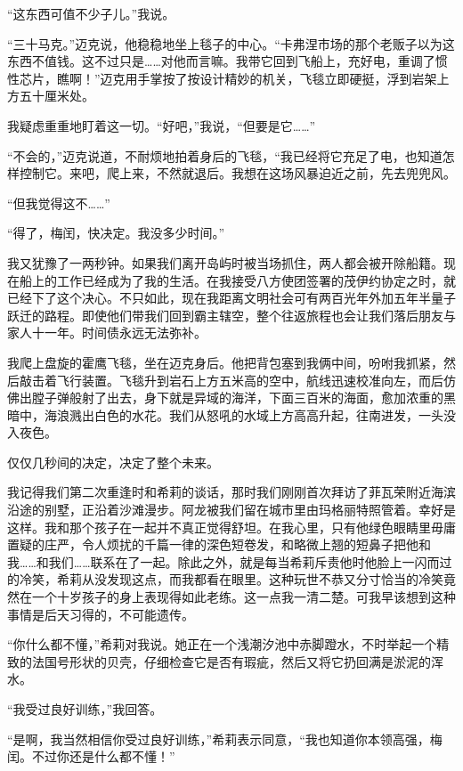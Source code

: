\documentclass[AutoFakeBold=true]{book}
\begin{document}
``这东西可值不少子儿。''我说。

``三十马克。''迈克说，他稳稳地坐上毯子的中心。``卡弗涅市场的那个老贩子以为这东西不值钱。这不过只是……对他而言嘛。我带它回到飞船上，充好电，重调了惯性芯片，瞧啊！''迈克用手掌按了按设计精妙的机关，飞毯立即硬挺，浮到岩架上方五十厘米处。

我疑虑重重地盯着这一切。``好吧，''我说，``但要是它……''

``不会的，''迈克说道，不耐烦地拍着身后的飞毯，``我已经将它充足了电，也知道怎样控制它。来吧，爬上来，不然就退后。我想在这场风暴迫近之前，先去兜兜风。

``但我觉得这不……''

``得了，梅闰，快决定。我没多少时间。''

我又犹豫了一两秒钟。如果我们离开岛屿时被当场抓住，两人都会被开除船籍。现在船上的工作已经成为了我的生活。在我接受八方使团签署的茂伊约协定之时，就已经下了这个决心。不只如此，现在我距离文明社会可有两百光年外加五年半量子跃迁的路程。即使他们带我们回到霸主辖空，整个往返旅程也会让我们落后朋友与家人十一年。时间债永远无法弥补。

我爬上盘旋的霍鹰飞毯，坐在迈克身后。他把背包塞到我俩中间，吩咐我抓紧，然后敲击着飞行装置。飞毯升到岩石上方五米高的空中，航线迅速校准向左，而后仿佛出膛子弹般射了出去，身下就是异域的海洋，下面三百米的海面，愈加浓重的黑暗中，海浪溅出白色的水花。我们从怒吼的水域上方高高升起，往南进发，一头没入夜色。

仅仅几秒间的决定，决定了整个未来。

\vspace*{1em}

我记得我们第二次重逢时和希莉的谈话，那时我们刚刚首次拜访了菲瓦荣附近海滨沿途的别墅，正沿着沙滩漫步。阿龙被我们留在城市里由玛格丽特照管着。幸好是这样。我和那个孩子在一起并不真正觉得舒坦。在我心里，只有他绿色眼睛里毋庸置疑的庄严，令人烦扰的千篇一律的深色短卷发，和略微上翘的短鼻子把他和我……和我们……联系在了一起。除此之外，就是每当希莉斥责他时他脸上一闪而过的冷笑，希莉从没发现这点，而我都看在眼里。这种玩世不恭又分寸恰当的冷笑竟然在一个十岁孩子的身上表现得如此老练。这一点我一清二楚。可我早该想到这种事情是后天习得的，不可能遗传。

``你什么都不懂，''希莉对我说。她正在一个浅潮汐池中赤脚蹬水，不时举起一个精致的法国号形状的贝壳，仔细检查它是否有瑕疵，然后又将它扔回满是淤泥的浑水。

``我受过良好训练，''我回答。

``是啊，我当然相信你受过良好训练，''希莉表示同意，``我也知道你本领高强，梅闰。不过你还是什么都不懂！''
\end{document}
